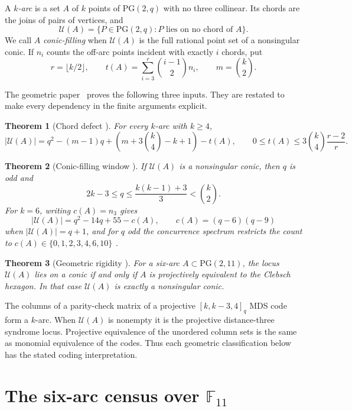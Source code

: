 \documentclass[11pt]{article}
\newtheorem{theorem}{Theorem}[section]
\theoremstyle{remark}
\newcommand{\PG}{\mathrm{PG}}
\newcommand{\F}{\mathbb{F}}
\newcommand{\cU}{\mathcal{U}}
\begin{document}
A \emph{$k$-arc} is a set $A$ of $k$ points of $\PG(2,q)$ with no three
collinear.  Its chords are the joins of pairs of vertices, and
\[
 \cU(A)=\{P\in\PG(2,q): P\text{ lies on no chord of }A\}.
\]
We call $A$ \emph{conic-filling} when $\cU(A)$ is the full rational point
set of a nonsingular conic.  If $n_i$ counts the off-arc points incident
with exactly $i$ chords, put
\[
 r=\lfloor k/2\rfloor,\qquad
 t(A)=\sum_{i=3}^{r}\binom{i-1}{2}n_i,\qquad
 m=\binom{k}{2}.
\]

The geometric paper~\cite{RuddRigidity2026} proves the following three
inputs.  They are restated to make every dependency in the finite arguments
explicit.

\begin{theorem}[Chord defect {\cite[Theorem 3.1]{RuddRigidity2026}}]
\label{lem:chord-defect}
For every $k$-arc with $k\ge4$,
\[
 |\cU(A)|=q^2-(m-1)q+
 \left(m+3\binom{k}{4}-k+1\right)-t(A),
\qquad
0\le t(A)\le3\binom{k}{4}\frac{r-2}{r}.
\]
\end{theorem}

\begin{theorem}[Conic-filling window
{\cite[Theorem 4.4]{RuddRigidity2026}}]
\label{cor:conic-filling-window}
If $\cU(A)$ is a nonsingular conic, then $q$ is odd and
\[
 2k-3\le q\le\frac{k(k-1)+3}{3}<\binom{k}{2}.
\]
For $k=6$, writing $c(A)=n_3$ gives
\[
 |\cU(A)|=q^2-14q+55-c(A),\qquad
 c(A)=(q-6)(q-9)
\]
when $|\cU(A)|=q+1$, and for $q$ odd the concurrence spectrum restricts the
count to $c(A)\in\{0,1,2,3,4,6,10\}$
{\cite[Proposition 3.2]{RuddRigidity2026}}.
\end{theorem}

\begin{theorem}[Geometric rigidity
{\cite[Theorem 1.1]{RuddRigidity2026}}]
\label{thm:rigidity}
For a six-arc $A\subset\PG(2,11)$, the locus $\cU(A)$ lies on a conic if
and only if $A$ is projectively equivalent to the Clebsch hexagon.  In that
case $\cU(A)$ is exactly a nonsingular conic.
\end{theorem}

The columns of a parity-check matrix of a projective
$[k,k-3,4]_q$ MDS code form a $k$-arc.  When $\cU(A)$ is nonempty it is
the projective distance-three syndrome locus.  Projective equivalence of
the unordered column sets is the same as monomial equivalence of the
codes.  Thus each geometric classification below has the stated coding
interpretation.

\section{The six-arc census over \texorpdfstring{$\F_{11}$}{F11}}
\end{document}
